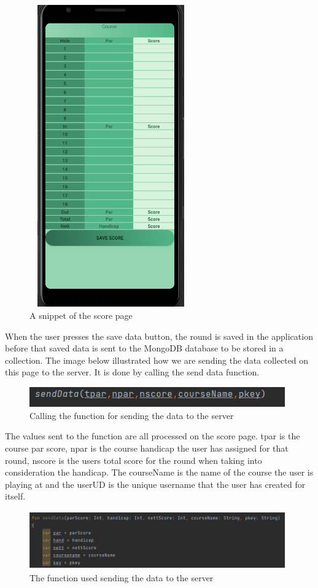 \begin{figure}[H]
    \centering
    \includegraphics[width=7cm, height = 13cm]{img/scorePage.PNG}
    \caption{A snippet of the score page}
    \label{fig:altas config}
\end{figure}
When the user presses the save data button, the round is saved in the application before that saved data is sent to the MongoDB database to be stored in a collection.
\newpage
The image below illustrated how we are sending the data collected on this page to the server. It is done by calling the send data function.
\begin{figure}[H]
    \centering
    \includegraphics[width=11cm]{img/sendDataFCall.PNG}
    \caption{Calling the function for sending the data to the server}
    \label{fig:altas config}
\end{figure}
The values sent to the function are all processed on the score page. tpar is the course par score, npar is the course handicap the user has assigned for that round, nscore is the users total score for the round when taking into consideration the handicap. The courseName is the name of the course the user is playing at and the userUD is the unique username that the user has created for itself.
\begin{figure}[H]
    \centering
    \includegraphics[width=11cm, height = 2.5cm]{img/sendDataFunction.PNG}
    \caption{The function used sending the data to the server}
    \label{fig:altas config}
\end{figure}
